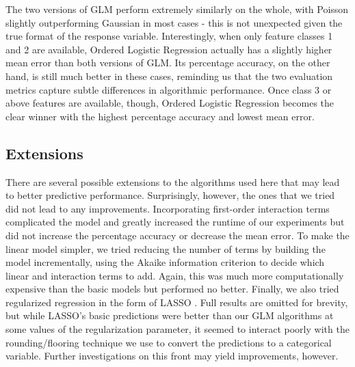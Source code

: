 The two versions of GLM perform extremely similarly on the whole, with Poisson slightly outperforming Gaussian in most cases - this is not unexpected given the true format of the response variable.  Interestingly, when only feature classes 1 and 2 are available, Ordered Logistic Regression actually has a slightly higher mean error than both versions of GLM.  Its percentage accuracy, on the other hand, is still much better in these cases, reminding us that the two evaluation metrics capture subtle differences in algorithmic performance.  Once class 3 or above features are available, though, Ordered Logistic Regression becomes the clear winner with the highest percentage accuracy and lowest mean error.

\subsection{Extensions}

There are several possible extensions to the algorithms used here that may lead to better predictive performance.  Surprisingly, however, the ones that we tried did not lead to any improvements.  Incorporating first-order interaction terms complicated the model and greatly increased the runtime of our experiments but did not increase the percentage accuracy or decrease the mean error.  To make the linear model simpler, we tried reducing the number of terms by building the model incrementally, using the Akaike information criterion \cite{} to decide which linear and interaction terms to add.  Again, this was much more computationally expensive than the basic models but performed no better.  Finally, we also tried regularized regression in the form of LASSO \cite{LASSO}.  Full results are omitted for brevity, but while LASSO's basic predictions were better than our GLM algorithms at some values of the regularization parameter, it seemed to interact poorly with the rounding/flooring technique we use to convert the predictions to a categorical variable.  Further investigations on this front may yield improvements, however.
